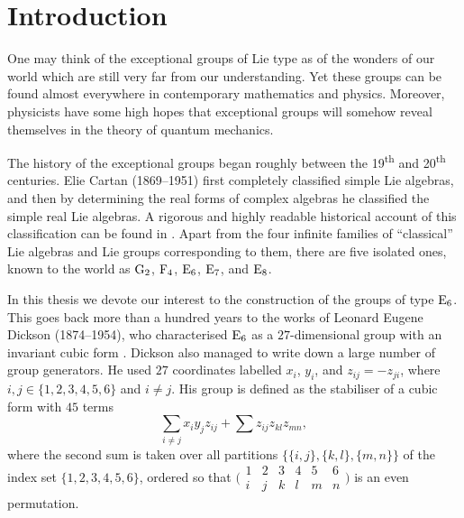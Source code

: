 \chapter*{Introduction}

\ifpdf
    \graphicspath{{Introduction/IntroductionFigs/PNG/}{Introduction/IntroductionFigs/PDF/}{Introduction/IntroductionFigs/}}
\else
    \graphicspath{{Introduction/IntroductionFigs/EPS/}{Introduction/IntroductionFigs/}}
\fi
\label{Intro}

One may think of the exceptional groups of Lie type 
as of the wonders of our
world which are still very far from our understanding. Yet these
groups can be found almost everywhere in contemporary mathematics
and physics. Moreover, physicists have some high hopes that
exceptional groups will somehow reveal themselves in the theory
of quantum mechanics. 

The history of the exceptional groups began roughly between
the 19\textsuperscript{th} and 
20\textsuperscript{th} centuries. Elie Cartan (1869--1951)
first completely classified simple Lie algebras, and then by 
determining the real forms of complex algebras he classified the
simple real Lie algebras. A rigorous and highly readable historical
account of this classification can be found in 
\cite{HawkinsThomas}. Apart from the four infinite families
of ``classical'' Lie algebras and Lie groups corresponding to
them, there are five isolated ones, known to the world as
$\mathrm{G}_2$, $\mathrm{F}_4$, $\mathrm{E}_6$, $\mathrm{E}_7$, and $\mathrm{E}_8$.

In this thesis we devote our interest to the construction of the
groups of type $\mathrm{E}_6$. This goes back more than a hundred years
to the works of Leonard Eugene Dickson (1874--1954),
who characterised $\mathrm{E}_6$ as a $27$-dimensional group with an
invariant cubic form \cite{Dickson1, Dickson2}. 
Dickson also managed to write down a 
large number of group generators. He used $27$ coordinates
labelled $x_i$, $y_i$, and $z_{ij} = -z_{ji}$, where 
$i,j \in \{1,2,3,4,5,6\}$ and $i \neq j$. His group is defined
as the stabiliser of a cubic form with $45$ terms
\begin{equation}
	\sum\limits_{i \neq j} x_i y_j z_{ij} + 
	\sum z_{ij} z_{kl} z_{mn},
\end{equation}
where the second sum is taken over all partitions 
$\{\{i, j\}, \{k, l\}, \{m, n\}\}$ of 
the index set
\mbox{$\{1,2,3,4,5,6\}$}, ordered so that $\bigl(\begin{smallmatrix}
  1 & 2 & 3 & 4 & 5 & 6 \\
  i & j & k & l & m & n
\end{smallmatrix}\bigr)$ is 
an even permutation.

